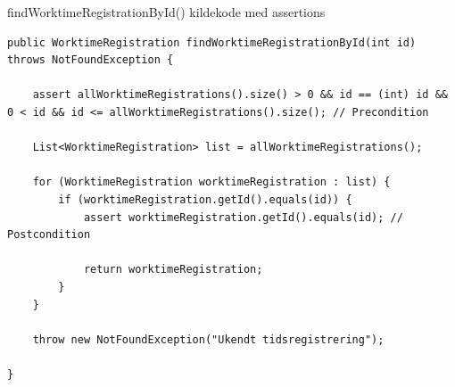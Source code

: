 \begin{listing}[H]
    \centering
    \caption{findWorktimeRegistrationById() kildekode med assertions}\label{lst:find_work_time_registration_by_id_assertions}
    \begin{verbatim}
public WorktimeRegistration findWorktimeRegistrationById(int id) throws NotFoundException {

    assert allWorktimeRegistrations().size() > 0 && id == (int) id && 0 < id && id <= allWorktimeRegistrations().size(); // Precondition
    
    List<WorktimeRegistration> list = allWorktimeRegistrations();

    for (WorktimeRegistration worktimeRegistration : list) {
        if (worktimeRegistration.getId().equals(id)) {
            assert worktimeRegistration.getId().equals(id); // Postcondition
            
            return worktimeRegistration;
        }
    }

    throw new NotFoundException("Ukendt tidsregistrering");

}
    \end{verbatim}
\end{listing}


